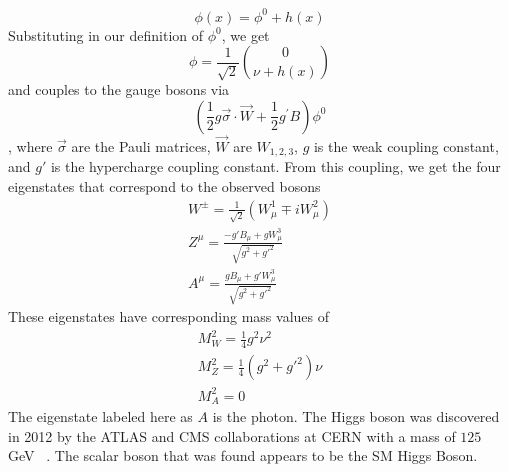 		\begin{equation}\label{eqn:phi-h} \phi(x) = \phi^0 + h(x) \end{equation}
		Substituting in our definition of $\phi^0$, we get
		\begin{equation}\label{eqn:phi-h-vec} \phi = \frac{1}{\sqrt{2}} \binom{0}{\nu+h(x)} \end{equation}
		and couples to the gauge bosons via 
		\begin{equation}\label{eqn:coupling} (\frac{1}{2} g \vec{\sigma} \cdot \vec{W} + \frac{1}{2} g^\prime B ) \phi^0  \end{equation}, where $\vec{\sigma}$ are the Pauli matrices, $\vec{W}$ are $W_{1,2,3}$, $g$ is the weak coupling constant, and $g\prime$ is the hypercharge coupling constant. From this coupling, we get the four eigenstates that correspond to the observed bosons
		\begin{equation}\label{eqn:mass-eigenstates} \begin{split}
		W^\pm = \frac{1}{\sqrt{2}} ( W^1_\mu \mp i W^2_\mu ) \\
		Z^\mu = \frac{ - g\prime B_\mu + g W^3_\mu }{ \sqrt{g^2+g\prime^2} } \\
		A^\mu = \frac{ g B_\mu + g\prime W^3_\mu }{ \sqrt{g^2+g\prime^2} }
		\end{split}
		\end{equation}
		These eigenstates have corresponding mass values of 
		\begin{equation}\label{eqn:mass-eigenstates-masses} \begin{split}
		M^2_W = \frac{1}{4}g^2\nu^2 \\
		M^2_Z = \frac{1}{4}(g^2+g\prime^2)\nu \\
		M^2_A = 0
		\end{split}
		\end{equation}
		The eigenstate labeled here as $A$ is the photon. The Higgs boson was discovered in 2012 by the ATLAS and CMS collaborations at CERN with a mass of $125$ GeV ~\cite{higgs-discovery-atlas}. The scalar boson that was found appears to be the SM Higgs Boson. 

